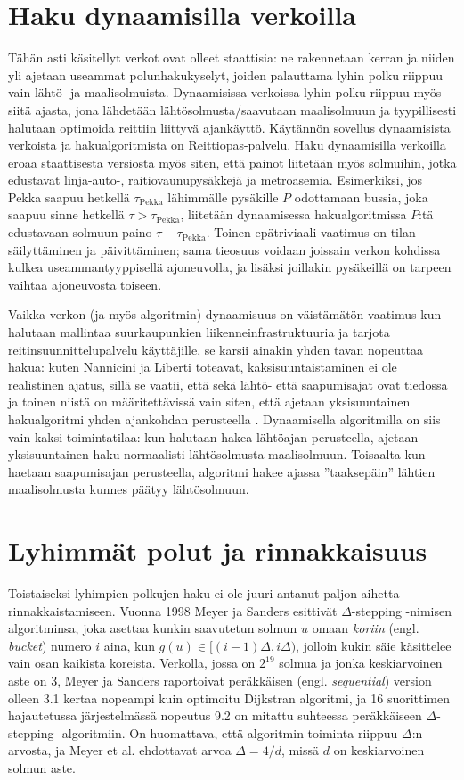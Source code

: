 \documentclass[finnish]{tktltiki2}
\theoremstyle{definition}
\theoremstyle{remark}
\begin{document}
\section{Haku dynaamisilla verkoilla}
Tähän asti käsitellyt verkot ovat olleet staattisia: ne rakennetaan kerran ja niiden yli ajetaan useammat polunhakukyselyt, joiden palauttama lyhin polku riippuu vain lähtö- ja maalisolmuista. Dynaamisissa verkoissa lyhin polku riippuu myös siitä ajasta, jona lähdetään lähtösolmusta/saavutaan maalisolmuun ja tyypillisesti halutaan optimoida reittiin liittyvä ajankäyttö. Käytännön sovellus dynaamisista verkoista ja hakualgoritmista on Reittiopas-palvelu. Haku dynaamisilla verkoilla eroaa staattisesta versiosta myös siten, että painot liitetään myös solmuihin, jotka edustavat linja-auto-, raitiovaunupysäkkejä ja metroasemia. Esimerkiksi, jos Pekka saapuu hetkellä $\tau_{\text{Pekka}}$ lähimmälle pysäkille $P$ odottamaan bussia, joka saapuu sinne hetkellä $\tau > \tau_{\text{Pekka}}$, liitetään dynaamisessa hakualgoritmissa $P$:tä edustavaan solmuun paino $\tau - \tau_{\text{Pekka}}$. Toinen epätriviaali vaatimus on tilan säilyttäminen ja päivittäminen; sama tieosuus voidaan joissain verkon kohdissa kulkea useammantyyppisellä ajoneuvolla, ja lisäksi joillakin pysäkeillä on tarpeen vaihtaa ajoneuvosta toiseen.

Vaikka verkon (ja myös algoritmin) dynaamisuus on väistämätön vaatimus kun halutaan mallintaa suurkaupunkien liikenneinfrastruktuuria ja tarjota reitinsuunnittelupalvelu käyttäjille, se karsii ainakin yhden tavan nopeuttaa hakua: kuten Nannicini ja Liberti toteavat, kaksisuuntaistaminen ei ole realistinen ajatus, sillä se vaatii, että sekä lähtö- että saapumisajat ovat tiedossa ja toinen niistä on määritettävissä vain siten, että ajetaan yksisuuntainen hakualgoritmi yhden ajankohdan perusteella \cite{Nannicini08}.
Dynaamisella algoritmilla on siis vain kaksi toimintatilaa: kun halutaan hakea lähtöajan perusteella, ajetaan yksisuuntainen haku normaalisti lähtösolmusta maalisolmuun. Toisaalta kun haetaan saapumisajan perusteella, algoritmi hakee ajassa ''taaksepäin'' lähtien maalisolmusta kunnes päätyy lähtösolmuun.

\section{Lyhimmät polut ja rinnakkaisuus}
\label{sec:parallel}
Toistaiseksi lyhimpien polkujen haku ei ole juuri antanut paljon aihetta rinnakkaistamiseen. Vuonna 1998 Meyer ja Sanders esittivät $\Delta$-stepping -nimisen algoritminsa, joka asettaa kunkin saavutetun solmun $u$ omaan \textit{koriin} (engl. \textit{bucket}) numero $i$ aina, kun $g(u) \in [(i - 1)\Delta, i\Delta)$, jolloin kukin säie käsittelee vain osan kaikista koreista. 
Verkolla, jossa on $2^{19}$ solmua ja jonka keskiarvoinen aste on 3, Meyer ja Sanders raportoivat peräkkäisen (engl. \textit{sequential}) version olleen 3.1 kertaa nopeampi kuin optimoitu Dijkstran algoritmi, ja 16 suorittimen hajautetussa järjestelmässä nopeutus 9.2 on mitattu suhteessa peräkkäiseen $\Delta$-stepping -algoritmiin. On huomattava, että algoritmin toiminta riippuu $\Delta$:n arvosta, ja Meyer et al. ehdottavat arvoa $\Delta = 4/d$, missä $d$ on keskiarvoinen solmun aste.
\end{document}
